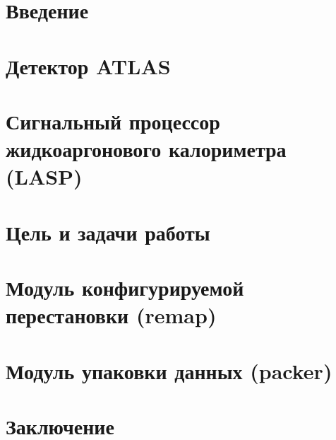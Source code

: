 \documentclass[a4paper, 14pt]{extarticle}
\begin{document}


\tableofcontents
\thispagestyle{empty}
\newpage

\setcounter{page}{3}
\section*{Введение}
    
    \newpage

\section{Детектор ATLAS}
    
    \newpage

\section{Сигнальный процессор жидкоаргонового калориметра (LASP)}
    
    \newpage

\section{Цель и задачи работы}
    
    \newpage

\section{Модуль конфигурируемой перестановки (remap)}
    
    \newpage

\section{Модуль упаковки данных (packer)}
    
    \newpage

\section*{Заключение}
    
    \newpage

%
\printbibliography
\end{document}
